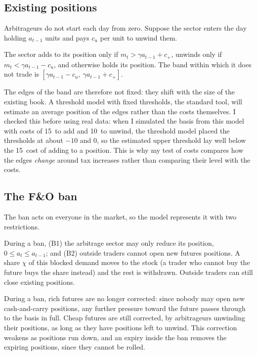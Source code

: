 \subsection{Existing positions}
Arbitrageurs do not start each day from zero. Suppose the sector enters the day holding $a_{t-1}$ units and pays $c_u$ per
unit to unwind them.

\begin{proposition}\label{prop:inv}
The sector adds to its position only if $m_t>\gamma a_{t-1}+c_+$, unwinds only if $m_t<\gamma a_{t-1}-c_u$, and otherwise
holds its position. The band within which it does not trade is $[\gamma a_{t-1}-c_u,\ \gamma a_{t-1}+c_+]$.
\end{proposition}
The edges of the band are therefore not fixed: they shift with the size of the existing book. A threshold model with fixed
thresholds, the standard tool, will estimate an average position of the edges rather than the costs themselves. I
checked this before using real data: when I simulated the basis from this model with costs of 15\bp\ to add and 10\bp\
to unwind, the threshold model placed the thresholds at about $-10$ and $0$\bp, so the estimated upper threshold lay well
below the 15\bp\ cost of adding to a position. This is why my test of costs compares how
the edges \emph{change} around tax increases rather than comparing their level with the costs.

\subsection{The F\&O ban}\label{sec:model-ban}
The ban acts on everyone in the market, so the model represents it with two restrictions.

\begin{assumption}\label{as:ban}
During a ban, (B1) the arbitrage sector may only reduce its position, $0\le a_t\le a_{t-1}$; and (B2) outside traders
cannot open new futures positions. A share $\chi$ of this blocked demand moves to the stock (a trader who cannot buy the
future buys the share instead) and the rest is withdrawn. Outside traders can still close existing positions.
\end{assumption}

\begin{proposition}\label{prop:onesided}
During a ban, rich futures are no longer corrected: since nobody may open new cash-and-carry positions, any further
pressure toward the future passes through to the basis in full. Cheap futures are still corrected, by arbitrageurs
unwinding their positions, as long as they have positions left to unwind. This correction weakens as positions run
down, and an expiry inside the ban removes the expiring positions, since they cannot be rolled.
\end{proposition}


